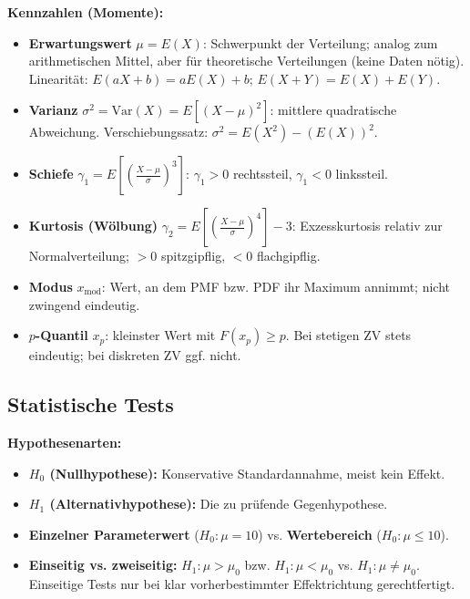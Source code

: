 \noindent\textbf{Kennzahlen (Momente):}
\begin{itemize}[leftmargin=1.5em]
    \item \textbf{Erwartungswert} $\mu = E(X)$: Schwerpunkt der Verteilung; analog zum arithmetischen Mittel, aber für theoretische Verteilungen (keine Daten nötig). Linearität: $E(aX + b) = aE(X) + b$; $E(X+Y) = E(X)+E(Y)$.

    \item \textbf{Varianz} $\sigma^2 = \text{Var}(X) = E\!\left[(X-\mu)^2\right]$: mittlere quadratische Abweichung. Verschiebungssatz: $\sigma^2 = E(X^2) - (E(X))^2$.

    \item \textbf{Schiefe} $\gamma_1 = E\!\left[\left(\tfrac{X-\mu}{\sigma}\right)^3\right]$: $\gamma_1 > 0$ rechtssteil, $\gamma_1 < 0$ linkssteil.

    \item \textbf{Kurtosis (Wölbung)} $\gamma_2 = E\!\left[\left(\tfrac{X-\mu}{\sigma}\right)^4\right] - 3$: Exzesskurtosis relativ zur Normalverteilung; $>0$ spitzgipflig, $<0$ flachgipflig.

    \item \textbf{Modus} $x_{\text{mod}}$: Wert, an dem PMF bzw. PDF ihr Maximum annimmt; nicht zwingend eindeutig.

    \item \textbf{$p$-Quantil} $x_p$: kleinster Wert mit $F(x_p) \geq p$. Bei stetigen ZV stets eindeutig; bei diskreten ZV ggf. nicht.
\end{itemize}

\newpage

\subsection{Statistische Tests}


\textbf{Hypothesenarten:}
\begin{itemize}[leftmargin=1.5em]
    \item \textbf{$H_0$ (Nullhypothese):} Konservative Standardannahme, meist kein Effekt.
    \item \textbf{$H_1$ (Alternativhypothese):} Die zu prüfende Gegenhypothese.
    \item \textbf{Einzelner Parameterwert} ($H_0: \mu = 10$) vs. \textbf{Wertebereich} ($H_0: \mu \leq 10$).
    \item \textbf{Einseitig vs. zweiseitig:} $H_1: \mu > \mu_0$ bzw. $H_1: \mu < \mu_0$ vs. $H_1: \mu \neq \mu_0$. Einseitige Tests nur bei klar vorherbestimmter Effektrichtung gerechtfertigt.
\end{itemize}

